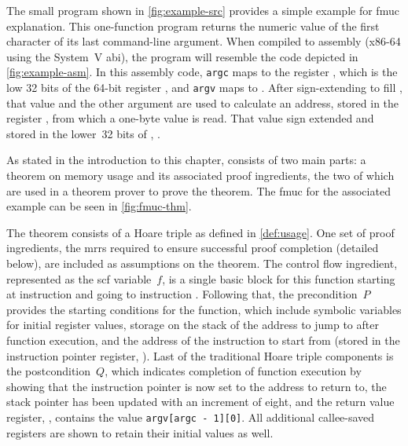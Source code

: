 The small program shown in \cref{fig:example-src} provides a simple example
for \ac{fmuc} explanation. This one-function program
returns the numeric value of the first character of its last command-line argument.
When compiled to assembly (x86-64 using the System~V \ac{abi}),
the program will resemble the code depicted in \cref{fig:example-asm}.
In this assembly code,
\lstinline|argc| maps to the register ,
which is the low 32 bits of the 64-bit register ,
and \lstinline|argv| maps to .
After sign-extending  to fill ,
that value and the other argument are used to calculate
an address, stored in the register ,
from which a one-byte value is read.
That value sign extended and stored in the lower~32 bits of ,
.

As stated in the introduction to this chapter,  consists of two main parts:
a theorem on memory usage and its associated proof ingredients,%
%
the two of which are used in a theorem prover to prove the theorem.
The \ac{fmuc} for the associated example can be seen in \cref{fig:fmuc-thm}.

The theorem consists of a Hoare triple as defined in \cref{def:usage}.%
One set of proof ingredients,
the \acp{mrr} required to ensure successful proof completion (detailed below),
are included as assumptions on the theorem.
The control flow ingredient,
represented as the \ac{scf} variable~$f$, is a single basic block for this function
starting at instruction  and going to instruction .
Following that,
the precondition~$P$ provides the starting conditions for the function,
which include symbolic variables for initial register values,
storage on the stack of the address to jump to after function execution,
and the address of the instruction to start from
(stored in the instruction pointer register, ).
Last of the traditional Hoare triple components is the postcondition~$Q$,
which indicates completion of function execution
by showing that the instruction pointer is now set to the address to return to,
the stack pointer  has been updated with an increment of eight,
and the return value register, ,
contains the value \lstinline|argv[argc - 1][0]|.
All additional callee-saved registers are shown to retain their initial values%
as well.

